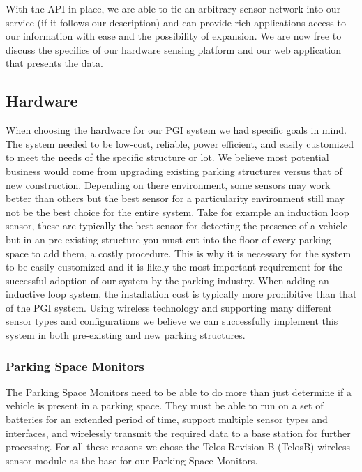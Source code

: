 \documentclass{acm_proc}
\begin{document}
With the API in place, we are able to tie an arbitrary sensor network into
our service (if it follows our description) and can provide rich
applications access to our information with ease and the possibility of
expansion.
We are now free to discuss the specifics of our hardware sensing platform
and our web application that presents the data.

\subsection{Hardware}
When choosing the hardware for our PGI system we had specific goals in
mind.  The system needed to be low-cost, reliable, power efficient, and
easily customized to meet the needs of the specific structure or lot.
We believe most potential business would come from upgrading existing
parking structures versus that of new construction.
Depending on there environment, some sensors may work better than others
but the best sensor for a particularity environment still may not be the
best choice for the entire system.
Take for example an induction loop sensor, these are typically the
best sensor for detecting the presence of a vehicle but in an pre-existing
structure you must cut into the floor of every parking space to add them, a
costly procedure.
This is why it is necessary for the system to be easily customized and it
is likely the most important requirement for the successful adoption of our
system by the parking industry.
When adding an inductive loop system, the installation cost is typically
more prohibitive than that of the PGI system.
Using wireless technology and supporting many different sensor types and
configurations we believe we can successfully implement this system in both
pre-existing and new parking structures.

\subsubsection{Parking Space Monitors}

The Parking Space Monitors need to be able to do more than just determine
if a vehicle is present in a parking space.
They must be able to run on a set of batteries for an extended period of
time, support multiple sensor types and interfaces, and wirelessly transmit
the required data to a base station for further processing.
For all these reasons we chose the Telos Revision B (TelosB) wireless
sensor module as the base for our Parking Space Monitors.
\end{document}
